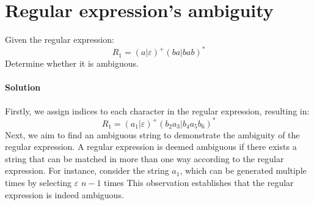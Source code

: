 \section{Regular expression's ambiguity}

Given the regular expression: 
\[R_1=(a|\varepsilon)^{+}(ba|bab)^{*}\]
Determine whether it is ambiguous.

\paragraph*{Solution}
Firstly, we assign indices to each character in the regular expression, resulting in:
\[R_1=(a_1|\varepsilon)^{+}(b_2a_3|b_4a_5b_6)^{*}\]
Next, we aim to find an ambiguous string to demonstrate the ambiguity of the regular expression. 
A regular expression is deemed ambiguous if there exists a string that can be matched in more than one way according to the regular expression.
For instance, consider the string $a_1$, which can be generated multiple times by selecting $\varepsilon$ $n - 1$ times
This observation establishes that the regular expression is indeed ambiguous.
